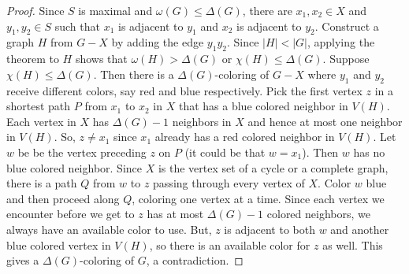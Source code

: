 \documentclass[openany]{tufte-book} %
\theoremstyle{plain}
\newcommand{\card}[1]{\left|#1\right|}
\begin{document}
\begin{proof}
Since $S$ is maximal and $\omega(G) \le \Delta(G)$, there are $x_1, x_2 \in X$ and $y_1, y_2 \in S$ such that $x_1$ is adjacent to $y_1$ and $x_2$ is adjacent to $y_2$.
Construct a graph $H$ from $G-X$ by adding the edge $y_1y_2$.  Since $\card{H} < \card{G}$, applying the theorem to $H$ shows that $\omega(H) > \Delta(G)$ or $\chi(H) \le \Delta(G)$.
Suppose $\chi(H) \le \Delta(G)$.  Then there is a $\Delta(G)$-coloring of $G-X$ where $y_1$ and $y_2$ receive different colors, say red and blue respectively.
Pick the first vertex $z$ in a shortest path $P$ from $x_1$ to $x_2$ in $X$ that has a blue colored neighbor in $V(H)$. 
Each vertex in $X$ has $\Delta(G)-1$ neighbors in $X$ and hence at most one neighbor in $V(H)$.  So, $z \ne x_1$ since $x_1$ already has a red colored neighbor in $V(H)$.
Let $w$ be be the vertex preceding $z$ on $P$ (it could be that $w = x_1$). Then $w$ has no blue colored neighbor.  Since $X$ is the vertex set of a cycle or a 
complete graph, there is a path $Q$ from $w$ to $z$ passing through every vertex of $X$.  Color $w$ blue and then proceed along $Q$, coloring one vertex at a time.  
Since each vertex we encounter before we get to $z$ has at most $\Delta(G) - 1$ colored neighbors, we always have an available color to use.  But, $z$ is adjacent
to both $w$ and another blue colored vertex in $V(H)$, so there is an available color for $z$ as well.  This gives a $\Delta(G)$-coloring of $G$, a contradiction.


\end{proof}
\end{document}
